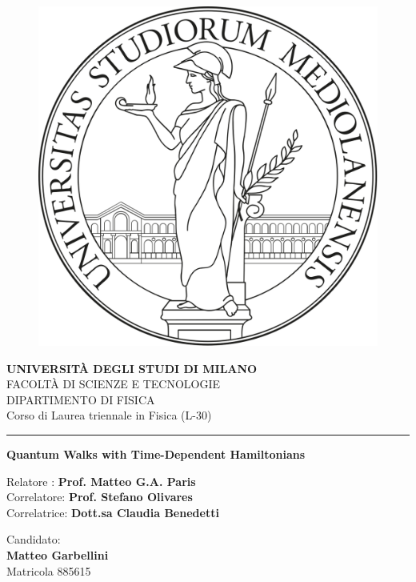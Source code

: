 \documentclass[11pt, twoside]{report}
\begin{document}
\begin{titlepage}
    \begin{center}
        \begin{figure}[hbt!]
             \centering
             \includegraphics[width=0.4 \textwidth]{./figures/unimi_logo_tesi}
        \end{figure}
        \textbf{\Large{UNIVERSIT\`A DEGLI STUDI DI MILANO}}\\
        \vspace{12pt}
        \Large{FACOLT\`A DI SCIENZE E TECNOLOGIE}\\
        \Large{DIPARTIMENTO DI FISICA}\\
        \Large{Corso di Laurea triennale in Fisica (L-30)}
        \vspace{24pt}
        \hrule
        \vspace{24pt}
        \textbf{\Large{Quantum Walks with Time-Dependent Hamiltonians}} \\ 
        
    \end{center}
    \vspace{120pt}
    \begin{flushleft}
        Relatore : 
        \textbf{Prof. Matteo G.A. Paris}\\
        Correlatore: 
        \textbf{Prof. Stefano Olivares}\\
        Correlatrice: 
        \textbf{Dott.sa Claudia Benedetti}
    \end{flushleft}
    \vspace{12pt}
    \begin{flushright}
        Candidato:\\
        \textbf{Matteo Garbellini}\\
        Matricola 885615\\
    \end{flushright}
\end{titlepage}
\newpage
\end{document}
